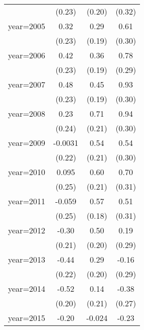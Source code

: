 \begin{sidewaystable}[htbp]
\begin{tabular}{l*{3}{c}}
                &   (0.23)         &   (0.20)         &   (0.32)         \\
\addlinespace
year=2005       &     0.32         &     0.29         &     0.61\sym{**} \\
                &   (0.23)         &   (0.19)         &   (0.30)         \\
\addlinespace
year=2006       &     0.42\sym{*}  &     0.36\sym{*}  &     0.78\sym{***}\\
                &   (0.23)         &   (0.19)         &   (0.29)         \\
\addlinespace
year=2007       &     0.48\sym{**} &     0.45\sym{**} &     0.93\sym{***}\\
                &   (0.23)         &   (0.19)         &   (0.30)         \\
\addlinespace
year=2008       &     0.23         &     0.71\sym{***}&     0.94\sym{***}\\
                &   (0.24)         &   (0.21)         &   (0.30)         \\
\addlinespace
year=2009       &  -0.0031         &     0.54\sym{**} &     0.54\sym{*}  \\
                &   (0.22)         &   (0.21)         &   (0.30)         \\
\addlinespace
year=2010       &    0.095         &     0.60\sym{***}&     0.70\sym{**} \\
                &   (0.25)         &   (0.21)         &   (0.31)         \\
\addlinespace
year=2011       &   -0.059         &     0.57\sym{***}&     0.51         \\
                &   (0.25)         &   (0.18)         &   (0.31)         \\
\addlinespace
year=2012       &    -0.30         &     0.50\sym{**} &     0.19         \\
                &   (0.21)         &   (0.20)         &   (0.29)         \\
\addlinespace
year=2013       &    -0.44\sym{**} &     0.29         &    -0.16         \\
                &   (0.22)         &   (0.20)         &   (0.29)         \\
\addlinespace
year=2014       &    -0.52\sym{**} &     0.14         &    -0.38         \\
                &   (0.20)         &   (0.21)         &   (0.27)         \\
\addlinespace
year=2015       &    -0.20         &   -0.024         &    -0.23         \\

\end{tabular}
\end{sidewaystable}
